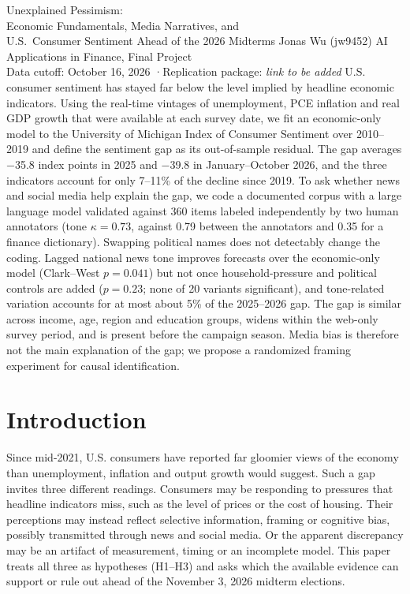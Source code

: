 \documentclass[11pt]{article}
\begin{document}
\maketitleblock
{Unexplained Pessimism:\\Economic Fundamentals, Media Narratives, and\\U.S.\ Consumer Sentiment Ahead of the 2026 Midterms}
{Jonas Wu (jw9452)}
{AI Applications in Finance, Final Project\\Data cutoff: October 16, 2026 \quad·\quad Replication package: \textit{link to be added}}
{U.S. consumer sentiment has stayed far below the level implied by headline economic indicators. Using the real-time vintages of unemployment, PCE inflation and real GDP growth that were available at each survey date, we fit an economic-only model to the University of Michigan Index of Consumer Sentiment over 2010–2019 and define the sentiment gap as its out-of-sample residual. The gap averages −35.8 index points in 2025 and −39.8 in January–October 2026, and the three indicators account for only 7–11\% of the decline since 2019. To ask whether news and social media help explain the gap, we code a documented corpus with a large language model validated against 360 items labeled independently by two human annotators (tone $\kappa = 0.73$, against 0.79 between the annotators and 0.35 for a finance dictionary). Swapping political names does not detectably change the coding. Lagged national news tone improves forecasts over the economic-only model (Clark–West $p = 0.041$) but not once household-pressure and political controls are added ($p = 0.23$; none of 20 variants significant), and tone-related variation accounts for at most about 5\% of the 2025–2026 gap. The gap is similar across income, age, region and education groups, widens within the web-only survey period, and is present before the campaign season. Media bias is therefore not the main explanation of the gap; we propose a randomized framing experiment for causal identification.}

\section{Introduction}

Since mid-2021, U.S. consumers have reported far gloomier views of the economy than unemployment, inflation and output growth would suggest. Such a gap invites three different readings. Consumers may be responding to pressures that headline indicators miss, such as the level of prices or the cost of housing. Their perceptions may instead reflect selective information, framing or cognitive bias, possibly transmitted through news and social media. Or the apparent discrepancy may be an artifact of measurement, timing or an incomplete model. This paper treats all three as hypotheses (H1–H3) and asks which the available evidence can support or rule out ahead of the November 3, 2026 midterm elections.
\end{document}
